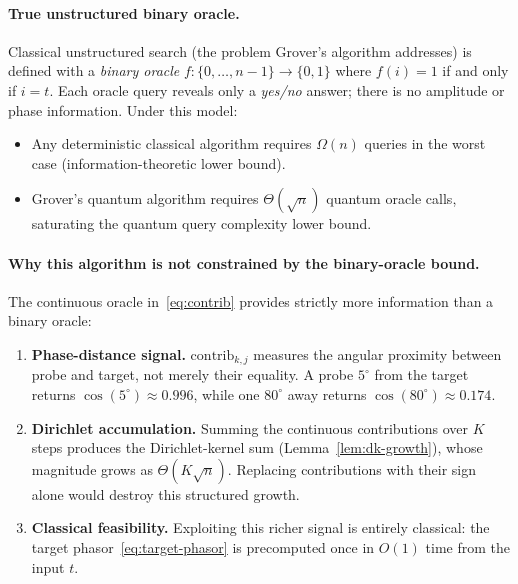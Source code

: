 \documentclass[12pt,a4paper]{article}
\theoremstyle{plain}
\theoremstyle{definition}
\theoremstyle{remark}
\begin{document}
\paragraph{True unstructured binary oracle.}
Classical unstructured search (the problem Grover's algorithm addresses) is
defined with a \emph{binary oracle} $f\colon\{0,\ldots,n-1\}\to\{0,1\}$ where
$f(i)=1$ if and only if $i=t$.  Each oracle query reveals only a
\emph{yes/no} answer; there is no amplitude or phase information.  Under this
model:
\begin{itemize}
  \item Any deterministic classical algorithm requires $\Omega(n)$ queries in
        the worst case (information-theoretic lower bound).
  \item Grover's quantum algorithm requires $\Theta(\sqrt{n})$ quantum oracle
        calls, saturating the quantum query complexity lower bound.
\end{itemize}

\paragraph{Why this algorithm is not constrained by the binary-oracle bound.}
The continuous oracle in~\eqref{eq:contrib} provides strictly more information
than a binary oracle:
\begin{enumerate}
  \item \textbf{Phase-distance signal.}  $\mathrm{contrib}_{k,j}$ measures the
    angular proximity between probe and target, not merely their equality.
    A probe $5^\circ$ from the target returns $\cos(5^\circ)\approx0.996$,
    while one $80^\circ$ away returns $\cos(80^\circ)\approx0.174$.
  \item \textbf{Dirichlet accumulation.}  Summing the continuous contributions
    over $K$ steps produces the Dirichlet-kernel sum (Lemma~\ref{lem:dk-growth}),
    whose magnitude grows as $\Theta(K\sqrt{n})$.  Replacing contributions with
    their sign alone would destroy this structured growth.
  \item \textbf{Classical feasibility.}  Exploiting this richer signal is
    entirely classical: the target phasor~\eqref{eq:target-phasor} is
    precomputed once in $O(1)$ time from the input $t$.
\end{enumerate}
\end{document}
